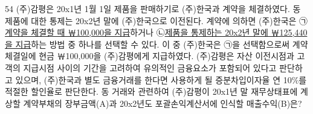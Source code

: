 \begin{question}{54}
(주)감평은 20x1년 1월 1일 제품을 판매하기로 (주)한국과 계약을 체결하였다. 동 제품에 대한 통제는 20x2년 말에 (주)한국으로 이전된다. 계약에 의하면 (주)한국은 ㉠\uline{계약을 체결할 때 ￦100,000을 지급}하거나 ㉡\uline{제품을 통제하는 20x2년 말에 ￦125,440을 지급}하는 방법 중 하나를 선택할 수 있다. 이 중 (주)한국은 ㉠을 선택함으로써 계약체결일에 현금 ￦100,000을 (주)감평에게 지급하였다. (주)감평은 자산 이전시점과 고객의 지급시점 사이의 기간을 고려하여 유의적인 금융요소가 포함되어 있다고 판단하고 있으며, (주)한국과 별도 금융거래를 한다면 사용하게 될 증분차입이자율 연 10\%를 적절한 할인율로 판단한다. 동 거래와 관련하여 (주)감평이 20x1년 말 재무상태표에 계상할 계약부채의 장부금액(A)과 20x2년도 포괄손익계산서에 인식할 매출수익(B)은?
{\par\noindent\hspace*{2em}\par}
\begin{choices}
  \item {}
  \item {}
  \item {}
  \item {}
  \item {}
\end{choices}
\end{question}
